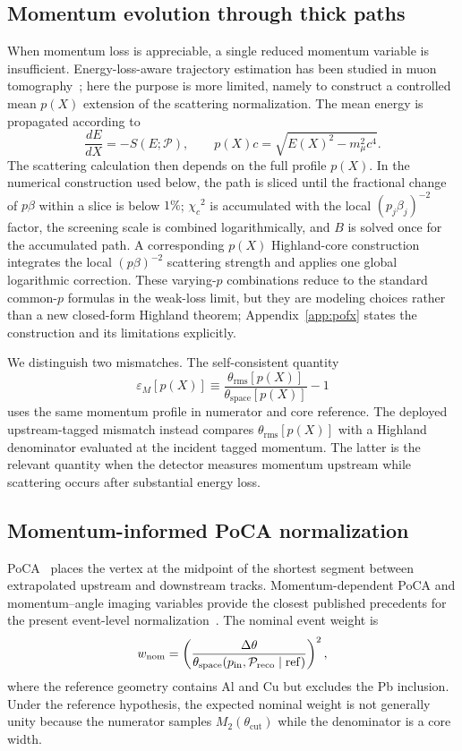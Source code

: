\documentclass[aps,pra,reprint,longbibliography,floatfix]{revtex4-2}
\newcommand{\epsM}{\ensuremath{\varepsilon_M}}
\newcommand{\thetaspace}{\ensuremath{\theta_{\mathrm{space}}}}
\newcommand{\thetarms}{\ensuremath{\theta_{\mathrm{rms}}}}
\newcommand{\thetacut}{\ensuremath{\theta_{\mathrm{cut}}}}
\newcommand{\dtheta}{\ensuremath{\Delta\theta}}
\newcommand{\chic}{\ensuremath{\chi_c}}
\newcommand{\pathP}{\ensuremath{\mathcal{P}}}
\begin{document}
\subsection{Momentum evolution through thick paths}\label{sec:eloss}
When momentum loss is appreciable, a single reduced momentum variable is insufficient.  Energy-loss-aware trajectory estimation has been studied in muon tomography~\cite{chatzidakis2018,ughade2025}; here the purpose is more limited, namely to construct a controlled mean $p(X)$ extension of the scattering normalization.  The mean energy is propagated according to
\begin{equation}\label{eq:dedx}
\frac{dE}{dX}=-S(E;\pathP),\qquad
p(X)c=\sqrt{E(X)^2-m_\mu^2c^4}.
\end{equation}
The scattering calculation then depends on the full profile $p(X)$.  In the numerical construction used below, the path is sliced until the fractional change of $p\beta$ within a slice is below $1\%$; $\chic^2$ is accumulated with the local $(p_j\beta_j)^{-2}$ factor, the screening scale is combined logarithmically, and $B$ is solved once for the accumulated path.  A corresponding $p(X)$ Highland-core construction integrates the local $(p\beta)^{-2}$ scattering strength and applies one global logarithmic correction.  These varying-$p$ combinations reduce to the standard common-$p$ formulas in the weak-loss limit, but they are modeling choices rather than a new closed-form Highland theorem; Appendix~\ref{app:pofx} states the construction and its limitations explicitly.

We distinguish two mismatches.  The self-consistent quantity
\begin{equation}\label{eq:eps_profile}
\epsM[p(X)]\equiv\frac{\thetarms[p(X)]}{\thetaspace[p(X)]}-1
\end{equation}
uses the same momentum profile in numerator and core reference.  The deployed upstream-tagged mismatch instead compares $\thetarms[p(X)]$ with a Highland denominator evaluated at the incident tagged momentum.  The latter is the relevant quantity when the detector measures momentum upstream while scattering occurs after substantial energy loss.

\subsection{Momentum-informed PoCA normalization}\label{sec:poca}
PoCA~\cite{schultz2004} places the vertex at the midpoint of the shortest segment between extrapolated upstream and downstream tracks.  Momentum-dependent PoCA and momentum--angle imaging variables provide the closest published precedents for the present event-level normalization~\cite{bae2022,bae2024ane,bae2024net,bae2024,yu2025}.  The nominal event weight is
\begin{equation}\label{eq:weight}
w_{\rm nom}=\left(\frac{\dtheta}{\thetaspace(p_{\rm in},\pathP_{\rm reco}\mid\mathrm{ref})}\right)^2,
\end{equation}
where the reference geometry contains Al and Cu but excludes the Pb inclusion.  Under the reference hypothesis, the expected nominal weight is not generally unity because the numerator samples $M_2(\thetacut)$ while the denominator is a core width.
\end{document}
